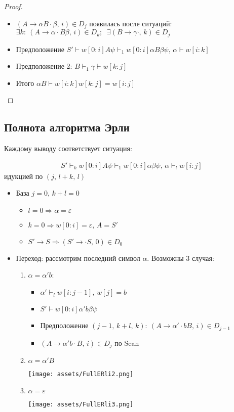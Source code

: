 \documentclass[a4paper,12pt]{article}
\theoremstyle{plain}
\theoremstyle{definition}
\theoremstyle{remark}
\begin{document}
\begin{proof}
\begin{itemize}
		      \begin{itemize}
			      \item $(A \to \alpha B \cdot\beta,\, i) \in D_j$ появилась после ситуаций: $\exists k :\: (A \to \alpha\cdot B \beta,\, i) \in D_k;\;\; \exists (B \to \gamma\cdot,\, k) \in D_j$
			      \item Предположение $S' \vdash w[0:i]A\psi \vdash_1 w[0:i]\alpha B\beta\psi,\, \alpha \vdash w[i:k]$
			      \item Предположение 2: $B \vdash_1 \gamma \vdash w[k:j]$
			      \item Итого $\alpha B \vdash w[i:k]w[k:j] = w[i:j]$
		      \end{itemize}
	\end{itemize}
\end{proof}

\subsection{Полнота алгоритма Эрли}
Каждому выводу соответствует ситуация:

\begin{align*}
	S' \vdash_k w[0:i]A\psi \vdash_1 w[0:i]\alpha\beta\psi,\, \alpha\vdash_l w[i:j]
\end{align*}
идукцией по $(j,\, l + k,\, l)$
\begin{itemize}
	\item База $j = 0,\, k + l = 0$
	      \begin{itemize}
		      \item $l = 0 \Rightarrow \alpha = \varepsilon$
		      \item $k = 0 \Rightarrow w[0:i] = \varepsilon,\, A = S'$
		      \item $S' \to S \Rightarrow (S' \to \cdot S,\, 0) \in D_0$
	      \end{itemize}
	\item Переход: рассмотрим последний символ $\alpha$. Возможны 3 случая:
	      \begin{enumerate}
		      \item $\alpha = \alpha' b$:
		            \begin{itemize}
			            \item $\alpha' \vdash_l w[i : j-1],\, w[j] = b$
			            \item $S' \vdash w[0:i]\alpha'b\beta\psi$
			            \item Предположение $(j - 1,\, k+l,\,k):\: (A \to \alpha'\cdot bB,\, i) \in D_{j - 1}$
			            \item $(A \to \alpha'b\cdot B,\, i) \in D_j$ по Scan
		            \end{itemize}
		      \item $\alpha = \alpha' B$

		            \texttt{[image: assets/FullERli2.png]}
		      \item $\alpha = \varepsilon$

		            \texttt{[image: assets/FullERli3.png]}
	      \end{enumerate}
\end{itemize}
\end{document}
